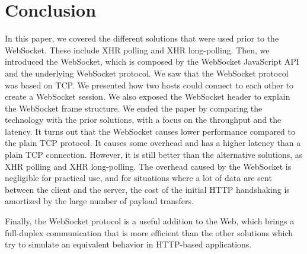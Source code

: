 \documentclass[journal,compsoc]{IEEEtran}
\newcommand{\ws}{WebSocket}
\begin{document}
\section{Conclusion}
In this paper, we covered the different solutions that were used prior to the \ws{}.
These include XHR polling and XHR long-polling.
Then, we introduced the \ws{}, which is composed by the \ws{} JavaScript API and the underlying \ws{} protocol.
We saw that the \ws{} protocol was based on TCP.
We presented how two hosts could connect to each other to create a \ws{} session.
We also exposed the \ws{} header to explain the \ws{} frame structure.
We ended the paper by comparing the technology with the prior solutions, with a focus on the throughput and the latency.
It turns out that the \ws{} causes lower performance compared to the plain TCP protocol.
It causes some overhead and has a higher latency than a plain TCP connection.
However, it is still better than the alternative solutions, as XHR polling and XHR long-polling.
The overhead caused by the \ws{} is negligible for practical use, and for situations where a lot of data are sent between the client and the server, the cost of the initial HTTP handshaking is amortized by the large number of payload transfers.


Finally, the \ws{} protocol is a useful addition to the Web, which brings a full-duplex communication that is more efficient than the other solutions which try to simulate an equivalent behavior in HTTP-based applications.

\ifCLASSOPTIONcaptionsoff
  \newpage
\fi




\end{document}
